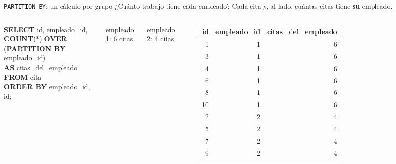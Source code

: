 \documentclass[aspectratio=169,10pt,c]{beamer}
\newcommand{\kw}[1]{\textcolor{utpRojo}{\textbf{#1}}}
\newcommand{\dentro}[1]{{\setlength{\fboxsep}{1.5pt}\colorbox{yellow!45}{#1}}}
\newcommand{\fila}{\rowcolor{yellow!45}}
\newcommand{\filagris}{\rowcolor{utpGrisClaro}}
\newenvironment{sqlcode}[1][.86\textwidth]
  {\begin{center}\begin{lrbox}{\sqlbuf}\begin{minipage}{#1}\ttfamily\footnotesize\vspace{6pt}\raggedright}
  {\vspace{6pt}\end{minipage}\end{lrbox}\colorbox{utpGrisClaro}{\usebox{\sqlbuf}}\end{center}}
\newcommand{\col}{\dimexpr\textwidth-2\fboxsep\relax}
\newcommand{\ind}{\hspace*{1.2em}}
\newcommand{\cab}[1]{\normalfont\bfseries #1}
\newcommand{\res}[3]{%
  \centering{\scriptsize\color{utpGris}resultado}\\[3pt]
  \footnotesize\ttfamily
  \begin{tabular}{#1}
  \toprule
  #2 \\
  \midrule
  #3
  \bottomrule
  \end{tabular}}
\begin{document}
\begin{frame}{\texttt{PARTITION BY}: un cálculo por grupo}
\renewcommand{\arraystretch}{0.82}
\small ¿Cuánto trabajo tiene cada empleado? Cada cita y, al lado, cuántas citas tiene \textbf{su} empleado.\par
\vspace{0.3cm}
\begin{columns}[c,onlytextwidth]
\begin{sqlcode}[\col]
\kw{SELECT} id, empleado\_id,\\
\ind\kw{COUNT}(*) \kw{OVER} (\dentro{\kw{PARTITION BY} empleado\_id})\\
\ind\ind\kw{AS} citas\_del\_empleado\\
\kw{FROM} cita\\
\kw{ORDER BY} empleado\_id, id;
\end{sqlcode}
\vspace{0.1cm}
\centering\colorbox{yellow!45}{\strut\footnotesize empleado 1: 6 citas}\quad\colorbox{utpGrisClaro}{\strut\footnotesize empleado 2: 4 citas}
\res{rrr}{\cab{id} & \cab{empleado\_id} & \cab{citas\_del\_empleado}}{%
    \fila 1 & 1 & 6 \\ \fila 3 & 1 & 6 \\ \fila 4 & 1 & 6 \\ \fila 6 & 1 & 6 \\ \fila 8 & 1 & 6 \\ \fila 10 & 1 & 6 \\
    \filagris 2 & 2 & 4 \\ \filagris 5 & 2 & 4 \\ \filagris 7 & 2 & 4 \\ \filagris 9 & 2 & 4 \\}
\end{columns}
\vspace{0.3cm}
\end{frame}
\end{document}

